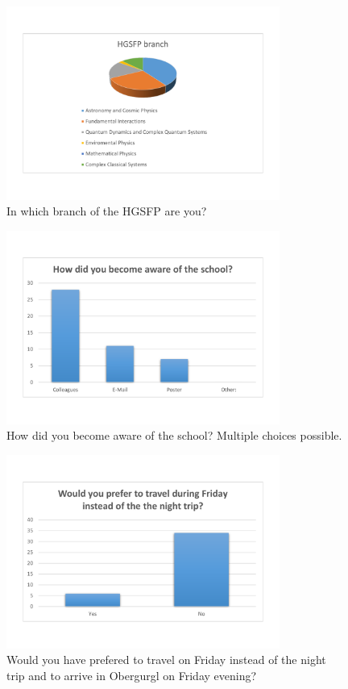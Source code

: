 \documentclass[11pt,a4paper]{article}
\numberwithin{equation}{section}
\numberwithin{table}{section}\setlength{\multlinegap}{25pt}
\begin{document}
\begin{figure}[H]
\centering
\includegraphics[width=0.8\textwidth]{eval/general/hgsfp_branch.pdf}
\caption{In which branch of the HGSFP are you?}
\end{figure}
\begin{figure}[H]
\centering
\includegraphics[width=0.8\textwidth]{eval/general/how_did_you_become_aware.pdf}
\caption{How did you become aware of the school? Multiple choices possible.}
\end{figure}
\begin{figure}[H]
\centering
\includegraphics[width=0.8\textwidth]{eval/general/travel_per_night.pdf}
\caption{Would you have prefered to travel on Friday instead of the night trip and to arrive in Obergurgl on Friday evening?}
\end{figure}
\end{document}
